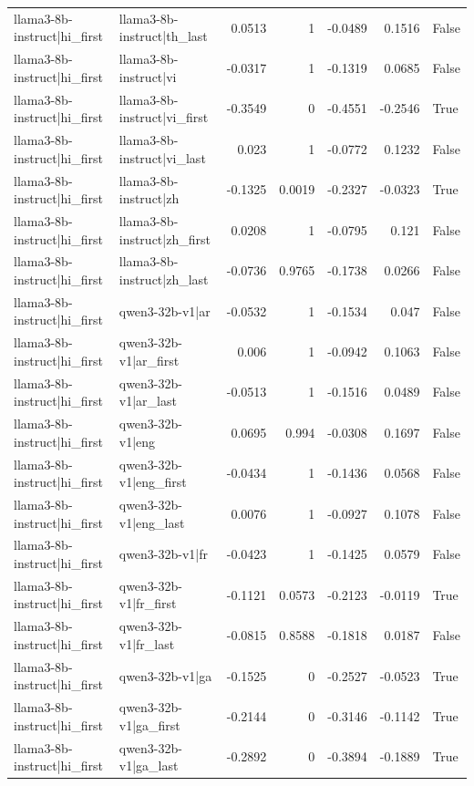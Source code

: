 \begin{table}
\begin{tabular}{l l r r r r l}
llama3-8b-instruct|hi_first & llama3-8b-instruct|th_last & 0.0513 & 1 & -0.0489 & 0.1516 & False \\
llama3-8b-instruct|hi_first & llama3-8b-instruct|vi & -0.0317 & 1 & -0.1319 & 0.0685 & False \\
llama3-8b-instruct|hi_first & llama3-8b-instruct|vi_first & -0.3549 & 0 & -0.4551 & -0.2546 & True \\
llama3-8b-instruct|hi_first & llama3-8b-instruct|vi_last & 0.023 & 1 & -0.0772 & 0.1232 & False \\
llama3-8b-instruct|hi_first & llama3-8b-instruct|zh & -0.1325 & 0.0019 & -0.2327 & -0.0323 & True \\
llama3-8b-instruct|hi_first & llama3-8b-instruct|zh_first & 0.0208 & 1 & -0.0795 & 0.121 & False \\
llama3-8b-instruct|hi_first & llama3-8b-instruct|zh_last & -0.0736 & 0.9765 & -0.1738 & 0.0266 & False \\
llama3-8b-instruct|hi_first & qwen3-32b-v1|ar & -0.0532 & 1 & -0.1534 & 0.047 & False \\
llama3-8b-instruct|hi_first & qwen3-32b-v1|ar_first & 0.006 & 1 & -0.0942 & 0.1063 & False \\
llama3-8b-instruct|hi_first & qwen3-32b-v1|ar_last & -0.0513 & 1 & -0.1516 & 0.0489 & False \\
llama3-8b-instruct|hi_first & qwen3-32b-v1|eng & 0.0695 & 0.994 & -0.0308 & 0.1697 & False \\
llama3-8b-instruct|hi_first & qwen3-32b-v1|eng_first & -0.0434 & 1 & -0.1436 & 0.0568 & False \\
llama3-8b-instruct|hi_first & qwen3-32b-v1|eng_last & 0.0076 & 1 & -0.0927 & 0.1078 & False \\
llama3-8b-instruct|hi_first & qwen3-32b-v1|fr & -0.0423 & 1 & -0.1425 & 0.0579 & False \\
llama3-8b-instruct|hi_first & qwen3-32b-v1|fr_first & -0.1121 & 0.0573 & -0.2123 & -0.0119 & True \\
llama3-8b-instruct|hi_first & qwen3-32b-v1|fr_last & -0.0815 & 0.8588 & -0.1818 & 0.0187 & False \\
llama3-8b-instruct|hi_first & qwen3-32b-v1|ga & -0.1525 & 0 & -0.2527 & -0.0523 & True \\
llama3-8b-instruct|hi_first & qwen3-32b-v1|ga_first & -0.2144 & 0 & -0.3146 & -0.1142 & True \\
llama3-8b-instruct|hi_first & qwen3-32b-v1|ga_last & -0.2892 & 0 & -0.3894 & -0.1889 & True \\

\end{tabular}
\end{table}
